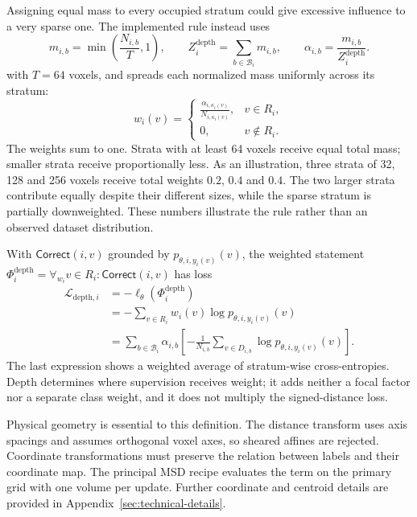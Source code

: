 \documentclass[12pt,a4paper]{article}
\begin{document}
Assigning equal mass to every occupied stratum could give excessive
influence to a very sparse one. The implemented rule instead uses
\begin{equation}
 m_{i,b}=\min\left(\frac{N_{i,b}}{T},1\right),
\qquad
 Z_i^{\mathrm{depth}}=\sum_{b\in\mathcal{B}_i}m_{i,b},
\qquad
 \alpha_{i,b}=\frac{m_{i,b}}{Z_i^{\mathrm{depth}}}.
\label{eq:depth-stratum-masses}
\end{equation}
with $T=64$ voxels, and spreads each normalized mass uniformly across
its stratum:
\begin{equation}
 w_i(v)=
 \begin{cases}
 \displaystyle\frac{\alpha_{i,\kappa_i(v)}}{N_{i,\kappa_i(v)}},
       &v\in R_i,\\[0.6em]
 0,    &v\notin R_i.
 \end{cases}
\label{eq:depth-voxel-weights}
\end{equation}
The weights sum to one. Strata with at least 64 voxels receive equal
total mass; smaller strata receive proportionally less. As an
illustration, three strata of 32, 128 and 256 voxels receive total
weights $0.2$, $0.4$ and $0.4$. The two larger strata contribute
equally despite their different sizes, while the sparse stratum is
partially downweighted. These numbers illustrate the rule rather
than an observed dataset distribution.

With $\mathsf{Correct}(i,v)$ grounded by
$p_{\theta,i,y_i(v)}(v)$, the weighted statement
$\Phi_i^{\mathrm{depth}}=\forall_{w_i}v\in R_i:
\mathsf{Correct}(i,v)$ has loss
\begin{equation}
\begin{aligned}
\mathcal{L}_{\mathrm{depth},i}
 &=-\ell_\theta(\Phi_i^{\mathrm{depth}})\\
 &=-\sum_{v\in R_i}w_i(v)\log p_{\theta,i,y_i(v)}(v)\\
 &=\sum_{b\in\mathcal{B}_i}\alpha_{i,b}
   \left[-\frac{1}{N_{i,b}}\sum_{v\in D_{i,b}}
                    \log p_{\theta,i,y_i(v)}(v)\right].
\end{aligned}
\label{eq:depth-weighted-class-loss}
\end{equation}
The last expression shows a weighted average of stratum-wise
cross-entropies. Depth determines where supervision receives weight;
it adds neither a focal factor nor a separate class weight, and it
does not multiply the signed-distance loss.

Physical geometry is essential to this definition. The distance
transform uses axis spacings and assumes orthogonal voxel axes,
so sheared affines are rejected. Coordinate transformations must
preserve the relation between labels and their coordinate map.
The principal MSD recipe evaluates the term on the primary grid
with one volume per update. Further coordinate and centroid details
are provided in Appendix~\ref{sec:technical-details}.
\end{document}
